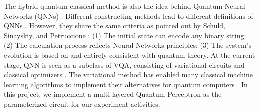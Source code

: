 The hybrid quantum-classical method is also the idea behind Quantum Neural Networks (QNNs) \cite{altaisky2001quantum}. 
Different constructing methods lead to different definitions of QNNs \cite{paetznick2013, zhaoBuildingQuantumNeural2019, caoQuantumNeuronElementary2017}. 
However, they share the same criteria as pointed out by Schuld, Sinayskiy, and Petruccione \cite{schuldQuestQuantumNeural2014}: 
(1) The initial state can encode any binary string;
(2) The calculation process reflects Neural Networks principles;
(3) The system's evolution is based on and entirely consistent with quantum theory.
At the current stage, QNN is seen as a subclass of VQA, consisting of variational circuits and classical optimizers \cite{abbasPowerQuantumNeural2021}.
The variational method has enabled many classical machine learning algorithms to implement their alternatives for quantum computers \cite{hugginsQuantumMachineLearning2019, takakiLearningTemporalData2021, shinguBoltzmannMachineLearning2021, dallaire-demersQuantumGenerativeAdversarial2018}.
In this project, we implement a multi-layered Quantum Perceptron \cite{kristensenArtificialSpikingQuantum2021} as the parameterized circuit for our experiment activities.


